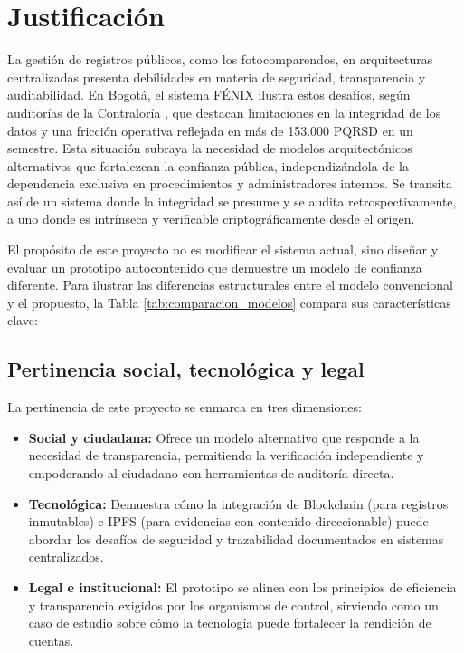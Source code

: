 \section{\large Justificación}
La gestión de registros públicos, como los fotocomparendos, en arquitecturas centralizadas presenta debilidades en materia de seguridad, transparencia y auditabilidad. En Bogotá, el sistema FÉNIX ilustra estos desafíos, según auditorías de la Contraloría \parencite{Informe 170100-0054-24} \parencite{Informe de Cumplimiento No. 90, 2023}, que destacan limitaciones en la integridad de los datos y una fricción operativa reflejada en más de 153.000 PQRSD en un semestre. Esta situación subraya la necesidad de modelos arquitectónicos alternativos que fortalezcan la confianza pública, independizándola de la dependencia exclusiva en procedimientos y administradores internos. Se transita así de un sistema donde la integridad se presume y se audita retrospectivamente, a uno donde es intrínseca y verificable criptográficamente desde el origen.

El propósito de este proyecto no es modificar el sistema actual, sino diseñar y evaluar un prototipo autocontenido que demuestre un modelo de confianza diferente. Para ilustrar las diferencias estructurales entre el modelo convencional y el propuesto, la Tabla \ref{tab:comparacion_modelos} compara sus características clave:



\subsection{Pertinencia social, tecnológica y legal}
La pertinencia de este proyecto se enmarca en tres dimensiones:
\begin{itemize}
\item \textbf{Social y ciudadana:} Ofrece un modelo alternativo que responde a la necesidad de transparencia, permitiendo la verificación independiente y empoderando al ciudadano con herramientas de auditoría directa.
\item \textbf{Tecnológica:} Demuestra cómo la integración de Blockchain (para registros inmutables) e IPFS (para evidencias con contenido direccionable) puede abordar los desafíos de seguridad y trazabilidad documentados en sistemas centralizados.
\item \textbf{Legal e institucional:} El prototipo se alinea con los principios de eficiencia y transparencia exigidos por los organismos de control, sirviendo como un caso de estudio sobre cómo la tecnología puede fortalecer la rendición de cuentas.
\end{itemize}


